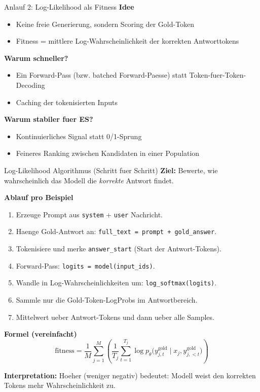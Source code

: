 \documentclass[aspectratio=169,11pt]{beamer}
\begin{document}
\begin{frame}{Anlauf 2: Log-Likelihood als Fitness}
\textbf{Idee}
\begin{itemize}
  \item Keine freie Generierung, sondern Scoring der Gold-Token
  \item Fitness = mittlere Log-Wahrscheinlichkeit der korrekten Antworttokens
\end{itemize}

\textbf{Warum schneller?}
\begin{itemize}
  \item Ein Forward-Pass (bzw. batched Forward-Paesse) statt Token-fuer-Token-Decoding
  \item Caching der tokenisierten Inputs
\end{itemize}

\textbf{Warum stabiler fuer ES?}
\begin{itemize}
  \item Kontinuierliches Signal statt 0/1-Sprung
  \item Feineres Ranking zwischen Kandidaten in einer Population
\end{itemize}
\end{frame}

\begin{frame}{Log-Likelihood Algorithmus (Schritt fuer Schritt)}
\textbf{Ziel:} Bewerte, wie wahrscheinlich das Modell die \emph{korrekte} Antwort findet.

\vspace{0.4em}
\textbf{Ablauf pro Beispiel}
\begin{enumerate}
  \item Erzeuge Prompt aus \texttt{system} + \texttt{user} Nachricht.
  \item Haenge Gold-Antwort an: \texttt{full\_text = prompt + gold\_answer}.
  \item Tokenisiere und merke \texttt{answer\_start} (Start der Antwort-Tokens).
  \item Forward-Pass: \texttt{logits = model(input\_ids)}.
  \item Wandle in Log-Wahrscheinlichkeiten um: \texttt{log\_softmax(logits)}.
  \item Sammle nur die Gold-Token-LogProbs im Antwortbereich.
  \item Mittelwert ueber Antwort-Tokens und dann ueber alle Samples.
\end{enumerate}

\vspace{0.4em}
\textbf{Formel (vereinfacht)}
\[
\text{fitness} = \frac{1}{M} \sum_{j=1}^{M}
\left(
\frac{1}{T_j} \sum_{t=1}^{T_j}
\log p_\theta\big(y_{j,t}^{\text{gold}} \mid x_j, y_{j,<t}^{\text{gold}}\big)
\right)
\]

\textbf{Interpretation:} Hoeher (weniger negativ) bedeutet: Modell weist den korrekten Tokens mehr Wahrscheinlichkeit zu.
\end{frame}
\end{document}
